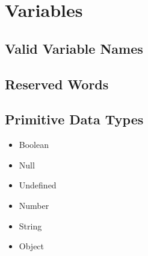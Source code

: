 \chapter{Variables}

\section{Valid Variable Names}

\section{Reserved Words}


\section{Primitive Data Types}

\begin{itemize}
	\item Boolean
	\item Null
	\item Undefined
	\item Number
	\item String
	\item Object
\end{itemize}


